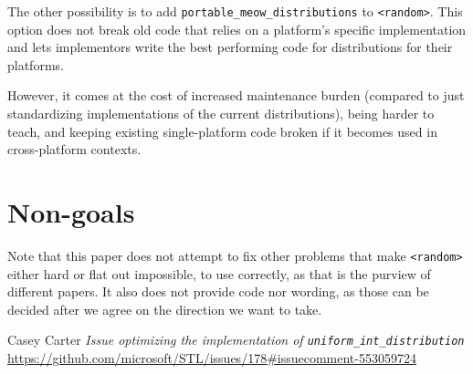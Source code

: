\documentclass{wg21}
\begin{document}
The other possibility is to add \texttt{portable_meow_distributions}
to \texttt{<random>}. This option does not break old code that relies
on a platform's specific implementation and lets implementors write
the best performing code for distributions for their platforms.

However, it comes at the cost of increased maintenance burden (compared
to just standardizing implementations of the current distributions), being
harder to teach, and keeping existing single-platform code broken if it
becomes used in cross-platform contexts.



\hypertarget{non-goals}{%
    \section{Non-goals}\label{non-goals}}

Note that this paper does not attempt to fix other problems that make
\texttt{<random>} either hard or flat out impossible, to use correctly,
as that is the purview of different papers. It also does not provide code
nor wording, as those can be decided after we agree on the direction we
want to take.


\begin{thebibliography}{9}

    Casey Carter
    \emph{Issue optimizing the implementation of \texttt{uniform_int_distribution}}
    \url{https://github.com/microsoft/STL/issues/178#issuecomment-553059724}

\end{thebibliography}
\end{document}
